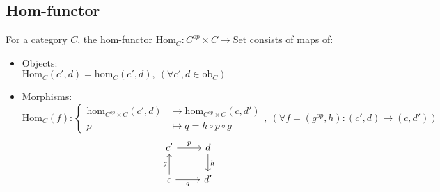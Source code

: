 \subsection*{Hom-functor}
For a category $C$, the hom-functor $\mathrm{Hom}_C : C^{op}\times C \to
\mathrm{Set}$ consists of maps of: \parencite{maclane:working_mathematician}
\begin{itemize}
  \item Objects:\\
    $\mathrm{Hom}_C (c', d) = \mathrm{hom}_C (c', d),
      \ (\forall c', d\in \mathrm{ob}_C)$
  \item Morphisms:
    \[
      \mathrm{Hom}_C (f) : \left\{
      \begin{aligned}
        \mathrm{hom}_{C^{op}\times C}(c', d) &\to
          \mathrm{hom}_{C^{op}\times C}(c, d')\\
        p &\mapsto q = h\circ p\circ g
      \end{aligned}
      \right.
      ,\ (\forall f=(g^{op}, h): (c', d)\to (c, d'))
    \]
    \[
      \begin{tikzcd}
      {c'} & d \\
      c & {d'}
      \arrow["g", from=2-1, to=1-1]
      \arrow["h", from=1-2, to=2-2]
      \arrow["p", from=1-1, to=1-2]
      \arrow["q"', from=2-1, to=2-2]
      \end{tikzcd}
    \]
\end{itemize}